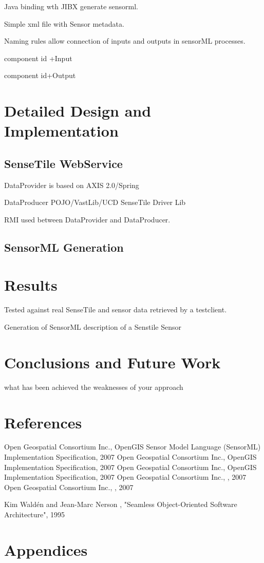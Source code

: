 \documentclass[]{final_report}
\begin{document}
Java binding wth JIBX  generate sensorml.

Simple xml file with Sensor metadata.

Naming rules allow connection of inputs and outputs
in sensorML processes.

 component id +Input

 component id+Output

\chapter{ Detailed Design and Implementation}

\section{SenseTile WebService}

DataProvider is based on AXIS 2.0/Spring

DataProducer POJO/VastLib/UCD SenseTile Driver Lib

RMI used between DataProvider and DataProducer.

\section{SensorML Generation}

\chapter{Results}

Tested against real SenseTile and sensor data retrieved by a testclient.

Generation of SensorML description of a Senstile Sensor

\chapter{ Conclusions and Future Work}

what has been achieved
the weaknesses of your approach

\chapter{References}
\newpage
\begin{thebibliography}{99}
Open Geospatial Consortium Inc., OpenGIS Sensor Model Language (SensorML) Implementation Specification, 2007
Open Geospatial Consortium Inc., OpenGIS  Implementation Specification, 2007
Open Geospatial Consortium Inc., OpenGIS  Implementation Specification, 2007
Open Geospatial Consortium Inc., , 2007
Open Geospatial Consortium Inc., , 2007


Kim Waldén and Jean-Marc Nerson , "Seamless Object-Oriented Software Architecture", 1995
\end{thebibliography}
\label{endpage}


\chapter{Appendices}
\end{document}
